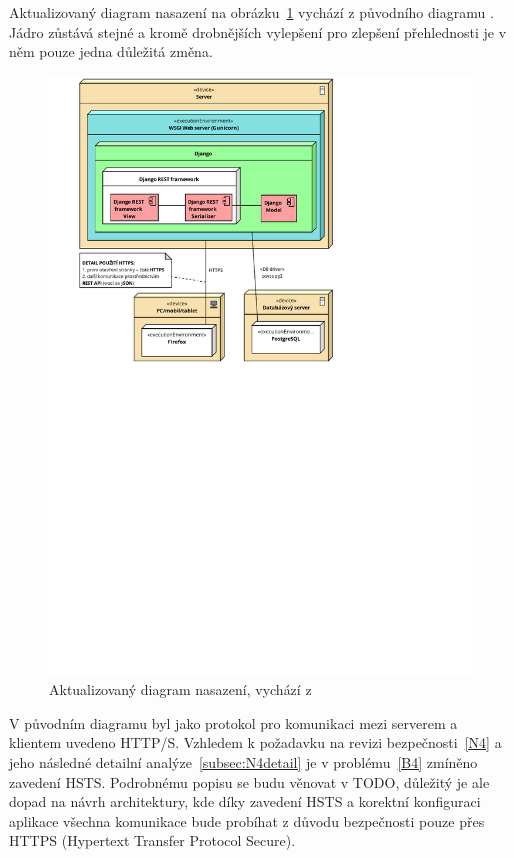 Aktualizovaný diagram nasazení na obrázku~\ref{fig:deployment-diagram} vychází z původního diagramu \cite{bp}. Jádro zůstává stejné a kromě drobnějších vylepšení pro zlepšení přehlednosti je v něm pouze jedna důležitá změna.
    
\begin{figure}[h]\centering
	\includegraphics[width=1\textwidth]{img/deployment-diagram}
	\caption[Aktualizovaný diagram nasazení]{Aktualizovaný diagram nasazení, vychází z~\cite{bp}}\label{fig:deployment-diagram}
\end{figure}

V původním diagramu byl jako protokol pro komunikaci mezi serverem a klientem uvedeno HTTP/S. Vzhledem k požadavku na revizi bezpečnosti~\ref{N4} a jeho následné detailní analýze~\ref{subsec:N4detail} je v problému~\ref{B4} zmíněno zavedení HSTS. Podrobnému popisu se budu věnovat v TODO, důležitý je ale dopad na návrh architektury, kde díky zavedení HSTS a korektní konfiguraci aplikace všechna komunikace bude probíhat z důvodu bezpečnosti pouze přes HTTPS (Hypertext Transfer Protocol Secure).

